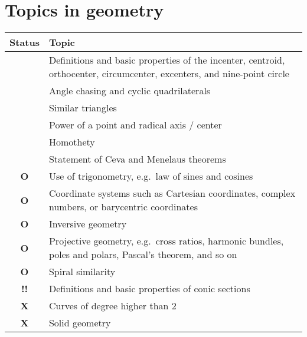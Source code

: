 \documentclass[11pt]{scrartcl}
\providecommand{\isRq}{{\color{green!60!black}\CheckmarkBold}}
\providecommand{\isUs}{{\color{cyan}\sffamily\bfseries O}}
\providecommand{\isAv}{{\color{gray}\sffamily\bfseries !!}}
\providecommand{\isEx}{{\color{red}\sffamily\bfseries X}}
\begin{document}
\section{Topics in geometry}
\begin{center}
	\begin{tabular}{cp{12cm}}
	\toprule Status & Topic \\ \midrule
	\isRq & Definitions and basic properties
		of the incenter, centroid, orthocenter, circumcenter,
		excenters, and nine-point circle \\
	\isRq & Angle chasing and cyclic quadrilaterals \\
	\isRq & Similar triangles \\
	\isRq & Power of a point and radical axis / center \\
	\isRq & Homothety \\
	\isRq & Statement of Ceva and Menelaus theorems \\
	\isUs & Use of trigonometry, e.g.\ law of sines and cosines \\
	\isUs & Coordinate systems such as Cartesian coordinates,
		complex numbers, or barycentric coordinates \\
	\isUs & Inversive geometry \\
	\isUs & Projective geometry, e.g.\ cross ratios, harmonic bundles, poles and polars,
		Pascal's theorem, and so on \\
	\isUs & Spiral similarity \\
	\isAv & Definitions and basic properties of conic sections \\
	\isEx & Curves of degree higher than $2$ \\
	\isEx & Solid geometry \\
	\bottomrule
	\end{tabular}
\end{center}
\end{document}

